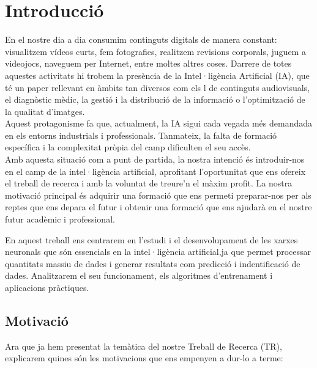 \chapter{Introducció}
\label{c:intro}
En el nostre dia a dia consumim continguts digitals de manera constant: visualitzem vídeos curts, fem fotografies, realitzem revisions corporals, juguem a videojocs, naveguem per Internet, entre moltes altres coses. Darrere de totes aquestes activitats hi trobem la presència de la Intel·ligència Artificial (IA), que té un paper rellevant en àmbits tan diversos com els l de continguts audiovisuals, el diagnòstic mèdic, la gestió i la distribució de la informació o l’optimització de la qualitat d’imatges.\\

Aquest protagonisme fa que, actualment, la IA sigui cada vegada més demandada en els entorns industrials i professionals. Tanmateix, la falta de formació específica i la complexitat pròpia del camp dificulten el seu accès.\\

Amb aquesta situació com a punt de partida, la nostra intenció és introduir-nos en el camp de la intel·ligència artificial, aprofitant l’oportunitat que ens ofereix el treball de recerca i amb la voluntat de treure’n el màxim profit. La nostra motivació principal és adquirir una formació que ens permeti preparar-nos per als reptes que ens depara el futur i obtenir una formació que ens ajudarà en el nostre futur acadèmic i professional.

En aquest treball ens centrarem en l'estudi i el desenvolupament de les xarxes neuronals que són essencials en la intel·ligència artificial,ja que permet processar quantitats massiu de dades i generar resultats com predicció i indentificació de dades. Analitzarem el seu funcionament, els algoritmes d'entrenament i aplicacions pràctiques.




\section{Motivació}
Ara que ja hem presentat la temàtica del nostre Treball de Recerca (TR), explicarem quines són les motivacions que ens empenyen a dur-lo a terme:

